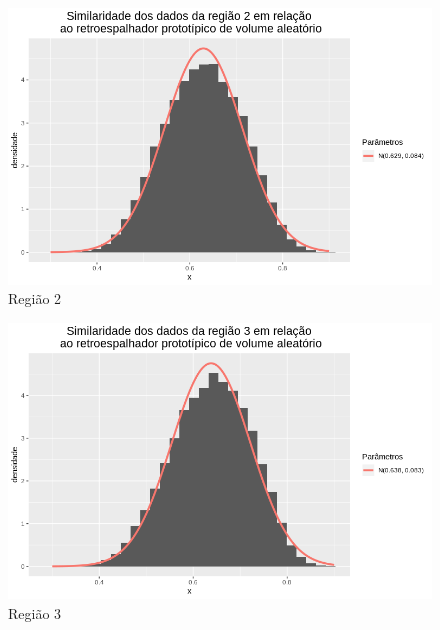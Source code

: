 \documentclass[12pt]{article}
\begin{document}
\begin{figure}[!h]
    \centering
    \vspace{0.1\linewidth}
    \includegraphics[width = 0.95\linewidth]{../../Images/Report_18_12_17/rv_region2.png}
    \caption{Região 2}
    \label{fig:rv_r2}
\end{figure}

\begin{figure}[!h]
    \centering
    \vspace{0.15\linewidth}
    \includegraphics[width = 0.95\linewidth]{../../Images/Report_18_12_17/rv_region3.png}
    \caption{Região 3}
    \label{fig:rv_r3}
\end{figure}
\end{document}
